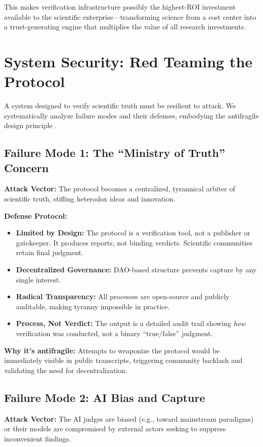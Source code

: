 \documentclass[11pt,a4paper]{article}
\begin{document}
This makes verification infrastructure possibly the highest-ROI investment available to the scientific enterprise—transforming science from a cost center into a trust-generating engine that multiplies the value of all research investments.

\section{System Security: Red Teaming the Protocol}
A system designed to verify scientific truth must be resilient to attack. We systematically analyze failure modes and their defenses, embodying the antifragile design principle \citep{Taleb2012}.

\subsection{Failure Mode 1: The ``Ministry of Truth'' Concern}
\textbf{Attack Vector:} The protocol becomes a centralized, tyrannical arbiter of scientific truth, stifling heterodox ideas and innovation.

\textbf{Defense Protocol:}
\begin{itemize}[nosep]
    \item \textbf{Limited by Design:} The protocol is a verification tool, not a publisher or gatekeeper. It produces reports, not binding verdicts. Scientific communities retain final judgment.
    \item \textbf{Decentralized Governance:} DAO-based structure prevents capture by any single interest.
    \item \textbf{Radical Transparency:} All processes are open-source and publicly auditable, making tyranny impossible in practice.
    \item \textbf{Process, Not Verdict:} The output is a detailed audit trail showing \textit{how} verification was conducted, not a binary ``true/false'' judgment.
\end{itemize}

\textbf{Why it's antifragile:} Attempts to weaponize the protocol would be immediately visible in public transcripts, triggering community backlash and validating the need for decentralization.

\subsection{Failure Mode 2: AI Bias and Capture}
\textbf{Attack Vector:} The AI judges are biased (e.g., toward mainstream paradigms) or their models are compromised by external actors seeking to suppress inconvenient findings.
\end{document}
